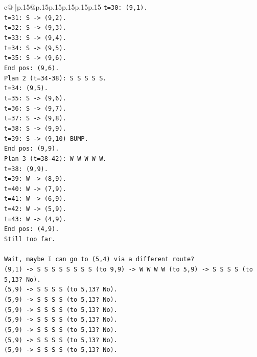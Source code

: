 \documentclass{article}
\begin{document}
{\begin{supertabular}{c@{$\;$}|p{.15\linewidth}@{}p{.15\linewidth}p{.15\linewidth}p{.15\linewidth}p{.15\linewidth}p{.15\linewidth}}
{{{\texttt{t=30: (9,1).} \\
\texttt{t=31: S {-}> (9,2).} \\
\texttt{t=32: S {-}> (9,3).} \\
\texttt{t=33: S {-}> (9,4).} \\
\texttt{t=34: S {-}> (9,5).} \\
\texttt{t=35: S {-}> (9,6).} \\
\texttt{End pos: (9,6).} \\
\texttt{Plan 2 (t=34{-}38): S S S S S.} \\
\texttt{t=34: (9,5).} \\
\texttt{t=35: S {-}> (9,6).} \\
\texttt{t=36: S {-}> (9,7).} \\
\texttt{t=37: S {-}> (9,8).} \\
\texttt{t=38: S {-}> (9,9).} \\
\texttt{t=39: S {-}> (9,10) BUMP.} \\
\texttt{End pos: (9,9).} \\
\texttt{Plan 3 (t=38{-}42): W W W W W.} \\
\texttt{t=38: (9,9).} \\
\texttt{t=39: W {-}> (8,9).} \\
\texttt{t=40: W {-}> (7,9).} \\
\texttt{t=41: W {-}> (6,9).} \\
\texttt{t=42: W {-}> (5,9).} \\
\texttt{t=43: W {-}> (4,9).} \\
\texttt{End pos: (4,9).} \\
\texttt{Still too far.} \\
\\ 
\texttt{Wait, maybe I can go to (5,4) via a different route?} \\
\texttt{(9,1) {-}> S S S S S S S S (to 9,9) {-}> W W W W (to 5,9) {-}> S S S S (to 5,13? No).} \\
\texttt{(5,9) {-}> S S S S (to 5,13? No).} \\
\texttt{(5,9) {-}> S S S S (to 5,13? No).} \\
\texttt{(5,9) {-}> S S S S (to 5,13? No).} \\
\texttt{(5,9) {-}> S S S S (to 5,13? No).} \\
\texttt{(5,9) {-}> S S S S (to 5,13? No).} \\
\texttt{(5,9) {-}> S S S S (to 5,13? No).} \\
\texttt{(5,9) {-}> S S S S (to 5,13? No).} \\
}}}
\end{supertabular}}
\end{document}
